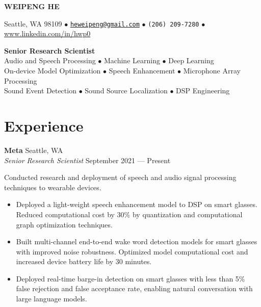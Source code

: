 \documentclass[a4paper,9pt]{extarticle} %
\begin{document}
\thispagestyle{empty}


\begin{center}
  {\Huge\bfseries\sffamily WEIPENG HE}

  Seattle, WA 98109 $\bullet$
  \href{mailto:heweipeng@gmail.com}{\texttt{heweipeng@gmail.com}} $\bullet$
  \texttt{(206) 209-7280} $\bullet$
  \url{www.linkedin.com/in/hwp0} 
\end{center}


\begin{center}
  {\LARGE\bfseries\sffamily Senior Research Scientist} \\[4pt]
  Audio and Speech Processing $\bullet$ Machine Learning $\bullet$ Deep Learning \\ 
  On-device Model Optimization $\bullet$ Speech Enhancement $\bullet$ Microphone Array Processing \\
  Sound Event Detection $\bullet$ Sound Source Localization $\bullet$ DSP Engineering
\end{center}


\section{Experience}

\textbf{Meta}  \hfill Seattle, WA \\
\textit{Senior Research Scientist} \hfill September 2021 --- Present%
\vspace{-.5\parskip}

Conducted research and deployment of speech and audio signal processing techniques to wearable devices.
\vspace{-.9\parskip}
\begin{itemize}[nosep]
  \item Deployed a light-weight speech enhancement model to DSP on smart glasses. Reduced computational cost by 30\% by quantization and computational graph optimization techniques.
  \item Built multi-channel end-to-end wake word detection models for smart glasses with improved noise robustness. Optimized model computational cost and increased device battery life by 30 minutes.
  \item Deployed real-time barge-in detection on smart glasses with less than 5\% false rejection and false acceptance rate, enabling natural conversation with large language models.
\end{itemize}
\end{document}
